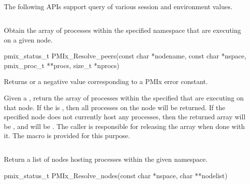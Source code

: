 The following \acp{API} support query of various session and environment values.

\subsection{}

\summary

Obtain the array of processes within the specified namespace that are executing on a given node.

\format

\cspecificstart
\begin{codepar}
pmix_status_t
PMIx_Resolve_peers(const char *nodename, const char *nspace,
                   pmix_proc_t **procs, size_t *nprocs)
\end{codepar}
\cspecificend

\begin{arglist}
\end{arglist}

Returns  or a negative value corresponding to a PMIx error constant.

\descr

Given a , return the array of processes within the specified 
that are executing on that node.
If the  is , then all processes on the node will be returned.
If the specified node does not currently host any processes, then the returned array will be , and  will be .
The caller is responsible for releasing the  array when done with it.
The  macro is provided for this purpose.

\subsection{}

\summary

Return a list of nodes hosting processes within the given namespace.

\format

\cspecificstart
\begin{codepar}
pmix_status_t
PMIx_Resolve_nodes(const char *nspace, char **nodelist)
\end{codepar}
\cspecificend

